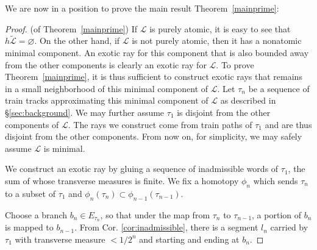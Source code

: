 \documentclass[11pt]{article} %
\theoremstyle{plain}
\theoremstyle{definition}
\numberwithin{equation}{section}
\begin{document}
We are now in a position to prove the main result Theorem~\ref{mainprime}:
\begin{proof}(of Theorem~\ref{mainprime})
If $\mathcal{L}$ is purely atomic, it is easy to see that $h\tilde{\mathcal{L}}=\varnothing$. On the other hand, if $\mathcal{L}$ is not purely atomic, then it has a nonatomic minimal component. An exotic ray for this component that is also bounded away from the other components is clearly an exotic ray for $\mathcal{L}$. To prove Theorem~\ref{mainprime}, it is thus sufficient to construct exotic rays that remains in a small neighborhood of this minimal component of $\mathcal{L}$. Let $\tau_n$ be a sequence of train tracks approximating this minimal component of $\mathcal{L}$ as described in \S\ref{sec:background}. We may further assume $\tau_1$ is disjoint from the other components of $\mathcal{L}$. The rays we construct come from train paths of $\tau_1$ and are thus disjoint from the other components. From now on, for simplicity, we may safely assume $\mathcal{L}$ is minimal.

We construct an exotic ray by gluing a sequence of inadmissible words of $\tau_1$, the sum of whose transverse measures is finite. We fix a homotopy $\phi_n$ which sends $\tau_n$ to a subset of $\tau_1$ and $\phi_n(\tau_n) \subset \phi_{n-1}(\tau_{n-1})$.

Choose a branch $b_n \in E_{\tau_n}$, so that under the map from $\tau_n$ to $\tau_{n-1}$, a portion of $b_n$ is mapped to $b_{n-1}$. 
From Cor. \ref{cor:inadmissible}, there is a segment $l_n$ carried by $\tau_1$ with transverse measure $<1/2^n$ and starting and ending at $b_n$.


\end{proof}
\end{document}
